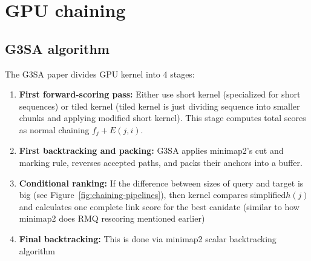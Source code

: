 
\section{GPU chaining}
\label{sec:chaining-b2}

\subsection{G3SA algorithm}

The G3SA paper divides GPU kernel into 4 stages:
\begin{enumerate}
\item \textbf{First forward-scoring pass:} Either use short kernel (specialized for short sequences) or tiled kernel (tiled kernel is just dividing 
sequence into smaller chunks and applying modified short kernel). This stage computes total scores as normal chaining $f_j + E(j,i)$.
\item \textbf{First backtracking and packing:}  G3SA applies minimap2's
    cut and marking rule, reverses accepted paths, and packs their anchors into a buffer.
\item \textbf{Conditional ranking:} If the difference between sizes of query and target is big (see Figure~\ref{fig:chaining-pipelines}), then 
    kernel compares simplified\(h(j)\) and calculates one complete link score for the best canidate (similar to how minimap2 does RMQ rescoring mentioned earlier)
\item \textbf{Final backtracking:} This is done via minimap2 scalar backtracking algorithm
\end{enumerate}


